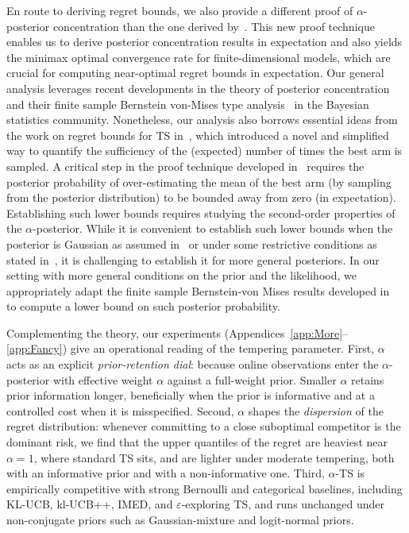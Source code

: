 \documentclass[11pt]{article}
\begin{document}
En route to deriving regret bounds, we also provide a different proof of $\alpha$-posterior concentration than the one derived by~\citet{bhattacharya2019bayesian}. This new proof technique enables us to derive posterior concentration results in expectation and also yields the minimax optimal convergence rate for finite-dimensional models, which are crucial for computing near-optimal regret bounds in expectation. Our general analysis leverages recent developments in the theory of posterior concentration~\citep{GGV,Kleijn2006,Ghosal_2007,bhattacharya2019bayesian,Yang2020,ZG,Alquier2020} and their finite sample Bernstein von-Mises type analysis~\citep{Spokoiny2012,Panov2015}
in the Bayesian statistics community. Nonetheless, our analysis also borrows essential ideas from the work on regret bounds for TS in~\cite{agrawal2013further}, which introduced a novel and simplified way to quantify the sufficiency of the (expected) number of times the best arm is sampled. A critical step in the proof technique developed in~\cite{agrawal2013further} requires the posterior probability of over-estimating the mean of the best arm (by sampling from the posterior distribution) to be bounded away from zero (in expectation). Establishing such lower bounds requires studying the second-order properties of the $\alpha$-posterior. While it is convenient to establish such lower bounds when the posterior is Gaussian as assumed in~\cite{agrawal2013further} or under some restrictive conditions as stated in~\cite{mazumdar20a}, it is challenging to establish it for more general posteriors. In our setting with more general conditions on the prior and the likelihood, we appropriately adapt the finite sample Bernstein-von Mises results developed in~\cite{Spokoiny2012,Panov2015} to compute a lower bound on such posterior probability.

Complementing the theory, our experiments (Appendices~\ref{app:More}--\ref{app:Fancy}) give an operational reading of the tempering parameter. First, $\alpha$ acts as an explicit \emph{prior-retention dial}: because online observations enter the $\alpha$-posterior with effective weight $\alpha$ against a full-weight prior. Smaller $\alpha$ retains prior information longer, beneficially when the prior is informative and at a controlled cost when it is misspecified. Second, $\alpha$ shapes the \emph{dispersion} of the regret distribution: whenever committing to a close suboptimal competitor is the dominant risk, we find that the upper quantiles of the regret are heaviest near $\alpha = 1$, where standard TS sits, and are lighter under moderate tempering, both with an informative prior and with a non-informative one. Third, $\alpha$-TS is empirically competitive with strong Bernoulli and categorical baselines, including KL-UCB, kl-UCB++, IMED, and $\varepsilon$-exploring TS, and runs unchanged under non-conjugate priors such as Gaussian-mixture and logit-normal priors.
\end{document}
